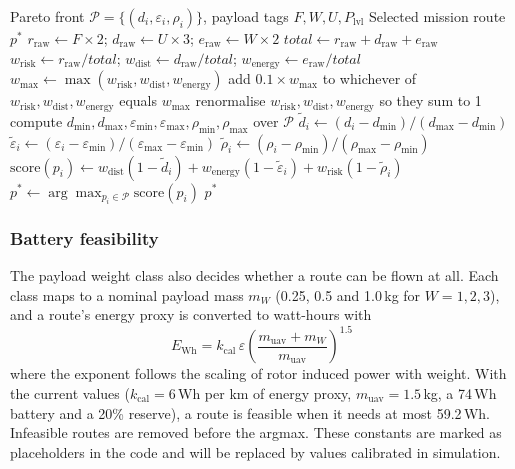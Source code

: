 \documentclass{ssnreview}
\begin{document}
\begin{algorithm}[H]
\caption{Payload-Driven Pareto Route Selection (Tier~2)}\label{alg:tier2}
\begin{algorithmic}[1]
\Require Pareto front $\mathcal{P} = \{(d_i,\varepsilon_i,\rho_i)\}$, payload tags $F, W, U, P_\mathrm{lvl}$
\Ensure Selected mission route $p^*$
\State $r_\mathrm{raw} \gets F \times 2$; \quad $d_\mathrm{raw} \gets U \times 3$; \quad $e_\mathrm{raw} \gets W \times 2$
\State $\mathit{total} \gets r_\mathrm{raw} + d_\mathrm{raw} + e_\mathrm{raw}$
\State $w_\mathrm{risk} \gets r_\mathrm{raw}/\mathit{total}$; \quad $w_\mathrm{dist} \gets d_\mathrm{raw}/\mathit{total}$; \quad $w_\mathrm{energy} \gets e_\mathrm{raw}/\mathit{total}$
 
    \State $w_\mathrm{max} \gets \max(w_\mathrm{risk}, w_\mathrm{dist}, w_\mathrm{energy})$
    \State add $0.1 \times w_\mathrm{max}$ to whichever of $w_\mathrm{risk}, w_\mathrm{dist}, w_\mathrm{energy}$ equals $w_\mathrm{max}$
    \State renormalise $w_\mathrm{risk}, w_\mathrm{dist}, w_\mathrm{energy}$ so they sum to 1
\EndIf
\State compute $d_{\min}, d_{\max}, \varepsilon_{\min}, \varepsilon_{\max}, \rho_{\min}, \rho_{\max}$ over $\mathcal{P}$
    \State $\tilde{d}_i \gets (d_i - d_{\min})/(d_{\max} - d_{\min})$ 
    \State $\tilde{\varepsilon}_i \gets (\varepsilon_i - \varepsilon_{\min})/(\varepsilon_{\max} - \varepsilon_{\min})$
    \State $\tilde{\rho}_i \gets (\rho_i - \rho_{\min})/(\rho_{\max} - \rho_{\min})$
    \State $\mathrm{score}(p_i) \gets w_\mathrm{dist}(1-\tilde{d}_i) + w_\mathrm{energy}(1-\tilde{\varepsilon}_i) + w_\mathrm{risk}(1-\tilde{\rho}_i)$
\EndFor
\State $p^* \gets \arg\max_{p_i \in \mathcal{P}} \mathrm{score}(p_i)$
\State \Return $p^*$
\end{algorithmic}
\end{algorithm}

\subsubsection{Battery feasibility}

The payload weight class also decides whether a route can be flown at all. Each class maps
to a nominal payload mass $m_W$ (0.25, 0.5 and 1.0\,kg for $W = 1, 2, 3$), and a route's
energy proxy is converted to watt-hours with
\begin{equation}
  E_\mathrm{Wh} = k_\mathrm{cal}\,\varepsilon\left(\frac{m_\mathrm{uav} + m_W}{m_\mathrm{uav}}\right)^{1.5} \label{eq:battery}
\end{equation}
where the exponent follows the scaling of rotor induced power with weight. With the
current values ($k_\mathrm{cal} = 6$\,Wh per km of energy proxy, $m_\mathrm{uav} = 1.5$\,kg,
a 74\,Wh battery and a 20\% reserve), a route is feasible when it needs at most
59.2\,Wh. Infeasible routes are removed before the argmax. These constants are marked as
placeholders in the code and will be replaced by values calibrated in simulation.
\end{document}
